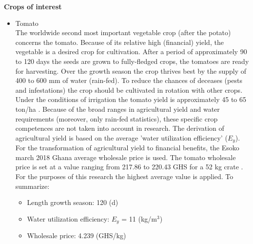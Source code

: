 \textbf{Crops of interest}
\begin{itemize}
\item{Tomato} \\
The worldwide second most important vegetable crop (after the potato) concerns the tomato. Because of its relative high (financial) yield, the vegetable is a desired crop for cultivation. After a period of approximately 90 to 120 days the seeds are grown to fully-fledged crops, the tomatoes are ready for harvesting. Over the growth season the crop thrives best by the supply of 400 to 600 mm of water (rain-fed). To reduce the chances of deceases (pests and infestations) the crop should be cultivated in rotation with other crops. Under the conditions of irrigation the tomato yield is approximately 45 to 65 ton/ha \citep{FAO2018a}. Because of the broad ranges in agricultural yield and water requirements (moreover, only rain-fed statistics), these specific crop competences are not taken into account in research. The derivation of agricultural yield is based on the average 'water utilization efficiency' ($E_y$). For the transformation of agricultural yield to financial benefits, the Esoko march 2018 Ghana average wholesale price is used. The tomato wholesale price is set at a value ranging from 217.86 to 220.43 GHS for a 52 kg crate \citep{ModernGhana2018}. For the purposes of this research the highest average value is applied. To summarize: 
\begin{itemize}
\item{Length growth season: 120 (d)}
\item{Water utilization efficiency: $E_y$ = 11 (kg/m$^3$)}
\item{Wholesale price: 4.239 (GHS/kg)}
\end{itemize}


\end{itemize}
